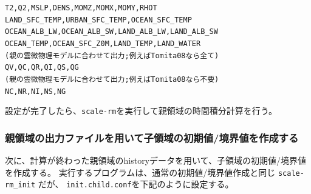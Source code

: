 \begin{alltt}
  T2, Q2, MSLP, DENS, MOMZ, MOMX, MOMY, RHOT
  LAND_SFC_TEMP, URBAN_SFC_TEMP, OCEAN_SFC_TEMP
  OCEAN_ALB_LW, OCEAN_ALB_SW, LAND_ALB_LW, LAND_ALB_SW
  OCEAN_TEMP, OCEAN_SFC_Z0M, LAND_TEMP, LAND_WATER
(親の雲微物理モデルに合わせて出力; 例えばTomita08なら全て)
  QV, QC, QR, QI, QS, QG
(親の雲微物理モデルに合わせて出力; 例えばTomita08なら不要)
  NC, NR, NI, NS, NG
\end{alltt}


設定が完了したら、\verb|scale-rm|を実行して親領域の時間積分計算を行う。

\subsubsection{親領域の出力ファイルを用いて子領域の初期値/境界値を作成する}
次に、計算が終わった親領域のhistoryデータを用いて、子領域の初期値/境界値を作成する。
実行するプログラムは、通常の初期値/境界値作成と同じ \verb|scale-rm_init| だが、
\verb|init.child.conf|を下記のように設定する。\\

